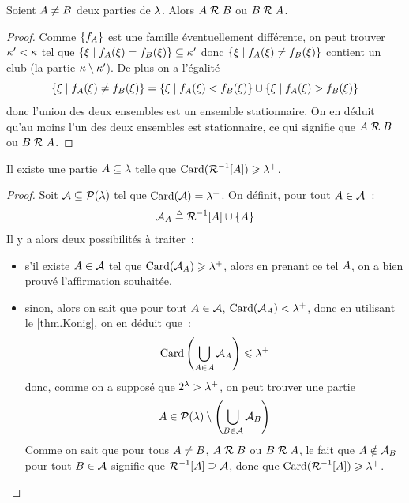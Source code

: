 \begin{property}
  Soient $A\neq B$ deux parties de $\lambda$. Alors
  $A\mathrel{\mathcal{R}} B$ ou $B\mathrel{\mathcal{R}} A$.
\end{property}

\begin{proof}
  Comme $\{f_{A}\}$ est une famille éventuellement différente, on peut
  trouver $\kappa' < \kappa$ tel que
  $\left\{ \xi \;\middle\vert\; f_{A}(\xi) =f_{B}(\xi) \right\}\subseteq\kappa'$
  donc $\left\{ \xi \;\middle\vert\; f_{A}(\xi)\neq f_{B}(\xi) \right\}$ contient un
  club (la partie $\kappa\setminus \kappa'$). De plus on a l'égalité
  \[\left\{ \xi \;\middle\vert\; f_{A}(\xi) \neq f_{B}(\xi) \right\} =
  \left\{ \xi \;\middle\vert\; f_{A}(\xi) < f_{B}(\xi) \right\}
  \cup \left\{ \xi \;\middle\vert\; f_{A}(\xi) > f_{B}(\xi) \right\}\]
  donc l'union des deux ensembles est un ensemble stationnaire. On en déduit
  qu'au moins l'un des deux ensembles est stationnaire, ce qui signifie que
  $A\mathrel{\mathcal{R}} B$ ou $B\mathrel{\mathcal{R}} A$.
\end{proof}

\begin{proposition}
  Il existe une partie $A\subseteq \lambda$ telle que
  $\operatorname{Card}(\mathord{\mathrel{\mathcal{R}}}^{-1}[A]) \geqslant \lambda^{+}$.
\end{proposition}

\begin{proof}
  Soit $\mathcal A\subseteq \mathcal{P}(\lambda)$ tel que
  $\operatorname{Card}(\mathcal A) = \lambda^{+}$. On définit, pour tout $A\in \mathcal A$~:
  \[\mathcal A_{A}\triangleq \mathord{\mathrel{\mathcal{R}}}^{-1}[A]\cup \{A\}\]
  Il y a alors deux possibilités à traiter~:
  \begin{itemize}
  \item s'il existe $A\in \mathcal A$ tel que
    $\operatorname{Card}(\mathcal A_{A})\geqslant \lambda^{+}$,
    alors en prenant ce tel $A$, on a bien prouvé l'affirmation souhaitée.
  \item sinon, alors on sait que pour tout $A\in \mathcal A$,
    $\operatorname{Card}(\mathcal A_{A})< \lambda^{+}$,
    donc en utilisant le \cref{thm.Konig}, on en déduit que~:
    \[\operatorname{Card}\left(\bigcup_{A\in \mathcal A}\mathcal A_{A}\right) \leqslant
    \lambda^{+}\]
    donc, comme on a supposé que $2^\lambda > \lambda^{+}$, on peut trouver une
    partie
    \[A\in \mathcal{P}(\lambda)\setminus
    \left(\bigcup_{B\in \mathcal A}\mathcal A_{B}\right)\]
    Comme on sait que pour tous $A\neq B$, $A\mathrel{\mathcal{R}} B$ ou
    $B\mathrel{\mathcal{R}} A$, le fait que $A\notin \mathcal A_{B}$ pour
    tout $B\in \mathcal A$ signifie que $\mathord{\mathrel{\mathcal{R}}}^{-1}[A]\supseteq \mathcal A$, donc
    que $\operatorname{Card}(\mathord{\mathrel{\mathcal{R}}}^{-1}[A]) \geqslant\lambda^{+}$.\qedhere
  \end{itemize}
\end{proof}

